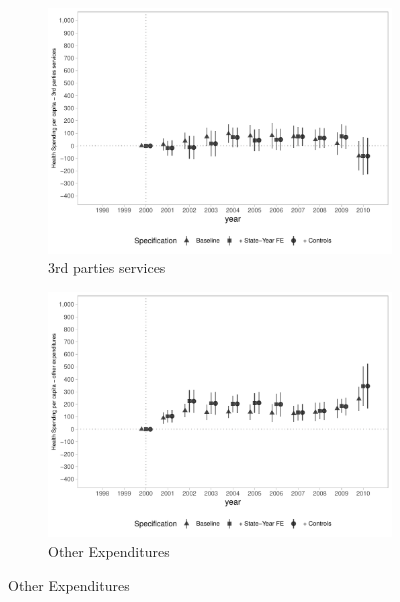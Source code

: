 \begin{figure}[h!]
\begin{center}
\begin{subfigure}{0.48\textwidth}
    \end{subfigure}
    \begin{subfigure}{0.48\textwidth}
        \centering
        \caption{\scriptsize 3rd parties services}\label{fig:10c}
        \includegraphics[width=\textwidth]{plots/spending/siops_despservicoster_pcapita_dist_ec29_baseline_dist_ec29_baseline_full.pdf}
    \end{subfigure}
    \begin{subfigure}{0.48\textwidth}
        \centering
        \caption{\scriptsize Other Expenditures}\label{fig:10d}
        \includegraphics[width=\textwidth]{plots/spending/siops_despoutros_pcapita_dist_ec29_baseline_dist_ec29_baseline_full.pdf}
    \end{subfigure}
    
    \end{center}
    
\end{figure}